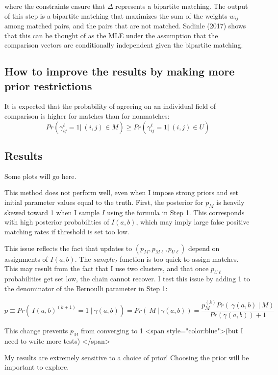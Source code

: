 \documentclass[11pt,reqno]{amsart}
\begin{document}
where the constraints ensure that $\Delta$ represents a bipartite matching.  The output of this step is a bipartite matching that maximizes the sum of the weights $w_{ij}$ among matched pairs, and the pairs that are not matched.  Sadinle (2017) shows that this can be thought of as the MLE under the assumption that the comparison vectors are conditionally independent given the bipartite matching. %


\subsection{How to improve the results by making more prior restrictions}

It is expected that the probability of agreeing on an individual field of comparison is higher for matches than for nonmatches:
$$Pr\left(\gamma_{ij}^{\ell} = 1 |\ (i,j)\in M\right) \geq Pr\left(\gamma_{ij}^{\ell} = 1 |\ (i,j) \in U\right) $$ 
\subsection{Results} Some plots will go here. 



This method does not perform well, even when I impose strong priors and set initial parameter values equal to the truth.   First, the posterior for $p_M$ is heavily skewed toward 1 when I sample $I$ using the formula in Step 1.  This corresponds with high posterior probabilities of $I(a,b)$, which may imply large false positive matching rates if threshold is set too low. 

This issue reflects the fact that updates to $(p_M, p_{M\ell}, p_{U\ell})$ depend on assignments of $I(a,b)$. The $sample_I$ function is too quick to assign matches.  This may result from the fact that I use two clusters, and that once $p_{U\ell}$ probabilities get set low, the chain cannot recover.  I test this issue by adding 1 to the denominator of the Bernoulli parameter in Step 1:

$$p \equiv Pr(\ I(a,b)^{(k+1)}=1\ |\ \gamma(a,b)) = Pr(\ M\  |\  \gamma(a,b)) = \frac{p_M^{(k)}Pr(\ \gamma(a,b)\ |\ M)}{Pr(\gamma(a,b)) + 1} $$ 

This change prevents $p_M$ from converging to 1 <span style="color:blue">(but I need to write more tests) </span>

My results are extremely sensitive to a choice of prior! Choosing the prior will be important to explore. 
\end{document}
